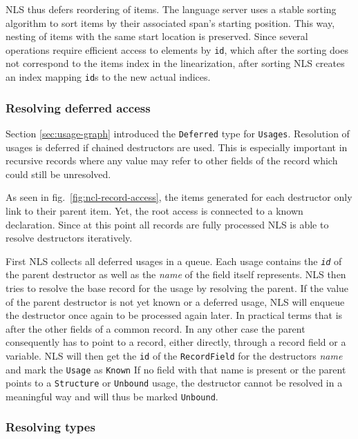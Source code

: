 \documentclass[
  a4paper,
  bibtex,
  english,
  nomenclature]{kthlatex/kththesis/kththesis}
\begin{document}
NLS thus defers reordering of items. The language server uses a stable
sorting algorithm to sort items by their associated span's starting
position. This way, nesting of items with the same start location is
preserved. Since several operations require efficient access to elements
by \texttt{id}, which after the sorting does not correspond to the items
index in the linearization, after sorting NLS creates an index mapping
\texttt{id}s to the new actual indices.

\hypertarget{sec:resolving-deferred-access}{%
\subsubsection{Resolving deferred
access}\label{sec:resolving-deferred-access}}

Section \ref{sec:usage-graph} introduced the \texttt{Deferred} type for
\texttt{Usages}. Resolution of usages is deferred if chained destructors
are used. This is especially important in recursive records where any
value may refer to other fields of the record which could still be
unresolved.

As seen in fig.~\ref{fig:ncl-record-access}, the items generated for
each destructor only link to their parent item. Yet, the root access is
connected to a known declaration. Since at this point all records are
fully processed NLS is able to resolve destructors iteratively.

First NLS collects all deferred usages in a queue. Each usage contains
the \emph{\texttt{id}} of the parent destructor as well as the
\emph{name} of the field itself represents. NLS then tries to resolve
the base record for the usage by resolving the parent. If the value of
the parent destructor is not yet known or a deferred usage, NLS will
enqueue the destructor once again to be processed again later. In
practical terms that is after the other fields of a common record. In
any other case the parent consequently has to point to a record, either
directly, through a record field or a variable. NLS will then get the
\texttt{id} of the \texttt{RecordField} for the destructors \emph{name}
and mark the \texttt{Usage} as \texttt{Known} If no field with that name
is present or the parent points to a \texttt{Structure} or
\texttt{Unbound} usage, the destructor cannot be resolved in a
meaningful way and will thus be marked \texttt{Unbound}.

\hypertarget{sec:resolving-types}{%
\subsubsection{Resolving types}\label{sec:resolving-types}}
\end{document}

